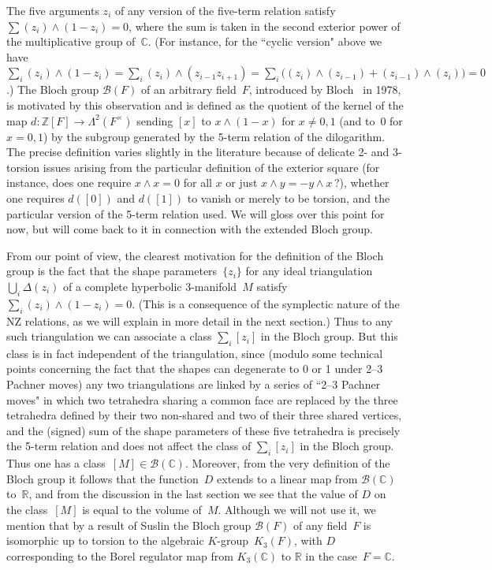 \documentclass[12pt,reqno]{amsart}
\theoremstyle{definition}
\def\B{\mathcal B}  \def\hB{\widehat\B}
\def\D{\Delta}
\def\WW{\mathsf\L^2}
\def\R{\mathbb R}
\def\C{\mathbb C}
\def\Z{\mathbb Z}
\def\L{\Lambda}
\begin{document}
The five arguments $z_i$ of any version of the five-term relation satisfy 
$\sum(z_i)\wedge(1-z_i)=0$, where the sum is taken in the second exterior power of the
multiplicative
group of~$\C$. (For instance, for the ``cyclic version" above we have $\sum_i(z_i)\wedge(1-z_i)
= \sum_i(z_i)\wedge(z_{i-1}z_{i+1})=\sum_i\bigl((z_i)\wedge(z_{i-1})+(z_{i-1})\wedge(z_i))=0$.)
The Bloch group $\B(F)$ of an arbitrary field~$F$, introduced by Bloch~\cite{Bloch} in 1978, 
is motivated by this observation and is defined
as the quotient of the kernel of the map $d:\Z[F]\to\WW(F^\times)$ sending $[x]$ to 
$x\wedge(1-x)$ for $x\ne0,1$ (and to~0 for $x=0,1$) by the subgroup generated by the 5-term
relation of the dilogarithm. The precise definition varies slightly in the literature
because of 
delicate 2- and 3-torsion issues arising from the particular definition of the exterior square 
(for instance, does one require $x\wedge x=0$ for all $x$ or just
$x\wedge y=-y\wedge x\,$?), whether
one requires $d([0])$ and $d([1])$ to vanish or merely to be torsion, and the particular
version of 
the 5-term relation used.  We will gloss over this point for now, but will come back to it in
connection with the extended Bloch group.

From our point of view, the clearest motivation for the definition of the Bloch group is
the fact that the shape parameters~$\{z_i\}$ for any ideal triangulation $\bigcup_i\D(z_i)$
of a complete hyperbolic \hbox{3-manifold~$M$} satisfy $\sum_i(z_i)\wedge(1-z_i)=0$.
(This is a 
consequence of the symplectic nature of the NZ relations, as we will explain in more detail 
in the next section.)  Thus to any such triangulation
we can associate a class $\sum_i[z_i]$ in the Bloch group.  But this class is in fact
independent 
of the triangulation, since (modulo some technical points concerning the fact that
the shapes can degenerate to 0 or 1 under 2--3 Pachner moves) any two triangulations are linked
by a series of ``2--3 Pachner moves" in which two tetrahedra sharing a common face are
replaced by the three tetrahedra defined by their two non-shared and two of their three
shared vertices, and the (signed) sum of the shape parameters of these five tetrahedra
is precisely the 5-term relation and does not affect the class of $\sum_i[z_i]$ in the
Bloch group.  Thus one has a class~$[M]\in\B(\C)$. Moreover, from the very definition of
the Bloch group it follows that the function~$D$ extends to a linear map from $\B(\C)$ 
to~$\R$, and from the discussion in the last section we see that the value of $D$ on the
class~$[M]$ is equal to the volume of~$M$. Although we will not use it, we mention that
by a result of Suslin the Bloch group $\B(F)$ of any field~$F$ is isomorphic up to torsion
to the algebraic $K$-group~$K_3(F)$, with $D$ corresponding to the Borel regulator map
from $K_3(\C)$ to $\R$ in the case~$F=\C$.
\end{document}
